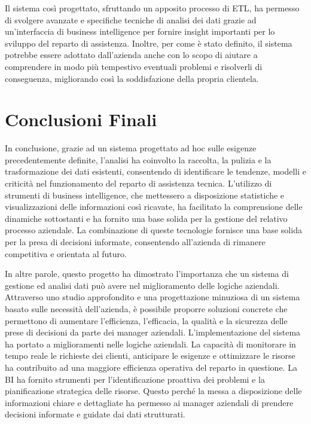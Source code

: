 Il sistema così progettato, sfruttando un apposito processo di ETL, ha permesso di svolgere avanzate e specifiche tecniche di analisi dei dati grazie ad un'interfaccia di business intelligence per fornire insight importanti per lo sviluppo del reparto di assistenza. Inoltre, per come è stato definito, il sistema potrebbe essere adottato dall'azienda anche con lo scopo di aiutare a comprendere in modo più tempestivo eventuali problemi e risolverli di conseguenza, migliorando così la soddisfazione della propria clientela.

\section{Conclusioni Finali}

In conclusione, grazie ad un sistema progettato ad hoc sulle esigenze precedentemente definite, l'analisi ha coinvolto la raccolta, la pulizia e la trasformazione dei dati esistenti, consentendo di identificare le tendenze, modelli e criticità nel funzionamento del reparto di assistenza tecnica. L'utilizzo di strumenti di business intelligence, che mettessero a disposizione statistiche e visualizzazioni delle informazioni così ricavate, ha facilitato la comprensione delle dinamiche sottostanti e ha fornito una base solida per la gestione del relativo processo aziendale. La combinazione di queste tecnologie fornisce una base solida per la presa di decisioni informate, consentendo all'azienda di rimanere competitiva e orientata al futuro.

In altre parole, questo progetto ha dimostrato l'importanza che un sistema di gestione ed analisi dati può avere nel miglioramento delle logiche aziendali. Attraverso uno studio approfondito e una progettazione minuziosa di un sistema basato sulle necessità dell'azienda, è possibile proporre soluzioni concrete che permettono di aumentare l'efficienza, l'efficacia, la qualità e la sicurezza delle prese di decisioni da parte dei manager aziendali. L'implementazione del sistema ha portato a miglioramenti nelle logiche aziendali. La capacità di monitorare in tempo reale le richieste dei clienti, anticipare le esigenze e ottimizzare le risorse ha contribuito ad una maggiore efficienza operativa del reparto in questione. La BI ha fornito strumenti per l'identificazione proattiva dei problemi e la pianificazione strategica delle risorse. Questo perché la messa a disposizione delle informazioni chiare e dettagliate ha permesso ai manager aziendali di prendere decisioni informate e guidate dai dati strutturati.

